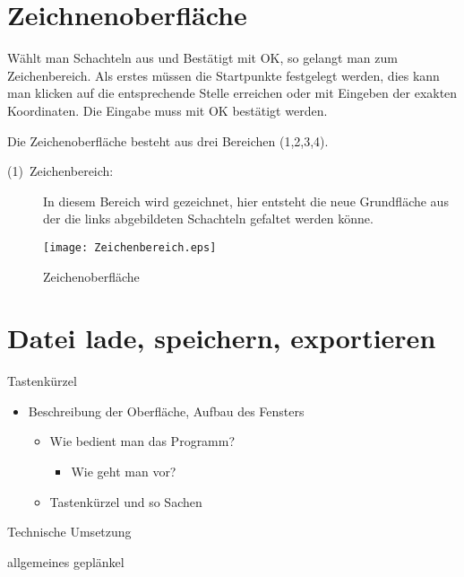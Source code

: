\section{Zeichnenoberfläche}

Wählt man Schachteln aus und Bestätigt mit OK, so gelangt man zum
Zeichenbereich. Als erstes müssen die Startpunkte festgelegt werden,
dies kann man klicken auf die entsprechende Stelle erreichen oder
mit Eingeben der exakten Koordinaten. Die Eingabe muss mit OK bestätigt
werden.

Die Zeichenoberfläche besteht aus drei Bereichen (1,2,3,4).
\begin{description}
\item [{(1)~Zeichenbereich:}] In diesem Bereich wird gezeichnet, hier
entsteht die neue Grundfläche aus der die links abgebildeten Schachteln
gefaltet werden könne.
\end{description}
\begin{figure}
\noindent \begin{centering}
\texttt{[image: Zeichenbereich.eps]}
\par\end{centering}

\caption{Zeichenoberfläche}


\end{figure}



\section{Datei lade, speichern, exportieren}

Tastenkürzel
\begin{itemize}
\item Beschreibung der Oberfläche, Aufbau des Fensters

\begin{itemize}
\item Wie bedient man das Programm?

\begin{itemize}
\item Wie geht man vor?
\end{itemize}
\item Tastenkürzel und so Sachen
\end{itemize}
\end{itemize}
Technische Umsetzung

allgemeines geplänkel

